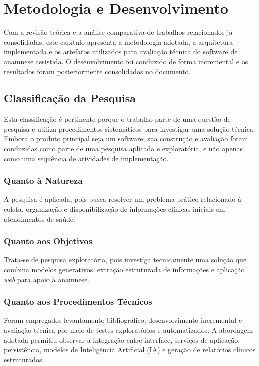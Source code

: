 \chapter{Metodologia e Desenvolvimento}
\label{cap:metodologia}

Com a revisão teórica e a análise comparativa de trabalhos relacionados já consolidadas, este capítulo
apresenta a metodologia adotada, a arquitetura implementada e os artefatos utilizados para avaliação
técnica do software de anamnese assistida. O desenvolvimento foi conduzido de forma incremental
e os resultados foram posteriormente consolidados no documento.

\section{Classificação da Pesquisa}

Esta classificação é pertinente porque o trabalho parte de uma questão de pesquisa e utiliza
procedimentos sistemáticos para investigar uma solução técnica. Embora o produto principal seja um
software, sua construção e avaliação foram conduzidas como parte de uma pesquisa aplicada e
exploratória, e não apenas como uma sequência de atividades de implementação.

\subsection{Quanto à Natureza}

A pesquisa é aplicada, pois busca resolver um problema prático relacionado à coleta,
organização e disponibilização de informações clínicas iniciais em atendimentos de saúde.

\subsection{Quanto aos Objetivos}

Trata-se de pesquisa exploratória, pois investiga tecnicamente uma solução que
combina modelos generativos, extração estruturada de informações e aplicação \textit{web} para apoio
à anamnese.

\subsection{Quanto aos Procedimentos Técnicos}

Foram empregados levantamento bibliográfico, desenvolvimento incremental e avaliação técnica
por meio de testes exploratórios e automatizados. A abordagem adotada permitiu observar a
integração entre interface, serviços de aplicação, persistência, modelos de Inteligência Artificial (IA) e geração de
relatórios clínicos estruturados.

